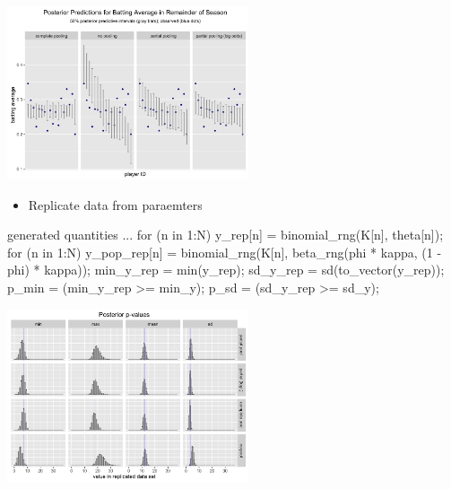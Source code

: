 \documentclass[10pt]{report}
\begin{document}
\begin{center}
\includegraphics[height=2in]{img/posterior-predictions.png}
\end{center}


%
\begin{itemize}
\item Replicate data from paraemters
\end{itemize}
\begin{stancode}
generated quantities {
  ...
  for (n in 1:N)
    y_rep[n] = binomial_rng(K[n], theta[n]);
  for (n in 1:N)
    y_pop_rep[n] = binomial_rng(K[n],
                               beta_rng(phi * kappa,
                                        (1 - phi) * kappa));
  min_y_rep = min(y_rep);
  sd_y_rep = sd(to_vector(y_rep));
  p_min = (min_y_rep >= min_y);
  p_sd = (sd_y_rep >= sd_y);
}
\end{stancode}

\begin{center}
\includegraphics[height=2in]{img/posterior-p-values.png}
\end{center}
\end{document}
